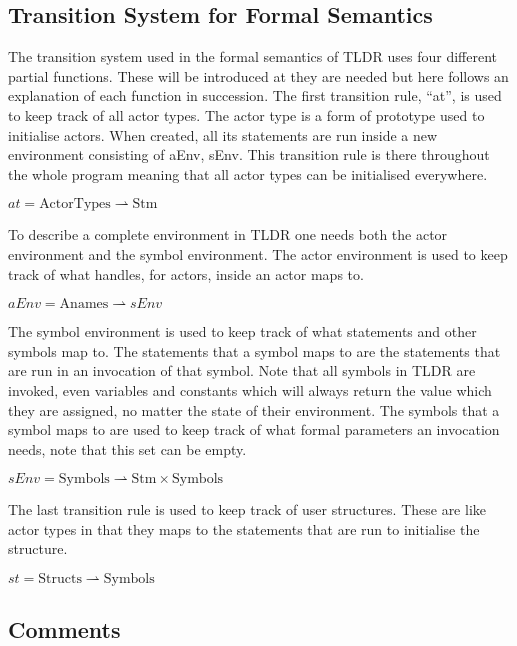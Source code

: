 \subsection{Transition System for Formal Semantics}
The transition system used in the formal semantics of TLDR uses four different partial functions. These will be introduced at they are needed but here follows an explanation of each function in succession.
The first transition rule, \enquote{at}, is used to keep track of all actor types. The actor type is a form of prototype used to initialise actors. When created, all its statements are run inside a new environment consisting of aEnv, sEnv. This transition rule is there throughout the whole program meaning that all actor types can be initialised everywhere.
\begin{center}
$at = \text{ActorTypes} \rightharpoonup \text{Stm}$
\end{center}
To describe a complete environment in TLDR one needs both the actor environment and the symbol environment. The actor environment is used to keep track of what handles, for actors, inside an actor maps to.
\begin{center}
$aEnv = \text{Anames} \rightharpoonup sEnv$
\end{center}
The symbol environment is used to keep track of what statements and other symbols map to. The statements that a symbol maps to are the statements that are run in an invocation of that symbol. Note that all symbols in TLDR are invoked, even variables and constants which will always return the value which they are assigned, no matter the state of their environment. The symbols that a symbol maps to are used to keep track of what formal parameters an invocation needs, note that this set can be empty.
\begin{center}
$sEnv = \text{Symbols} \rightharpoonup \text{Stm} \times \text{Symbols}$
\end{center}
The last transition rule is used to keep track of user structures. These are like actor types in that they maps to the statements that are run to initialise the structure.
\begin{center}
$st = \text{Structs} \rightharpoonup \text{Symbols}$
\end{center}

\subsection{Comments}
\label{subsec:comments}

